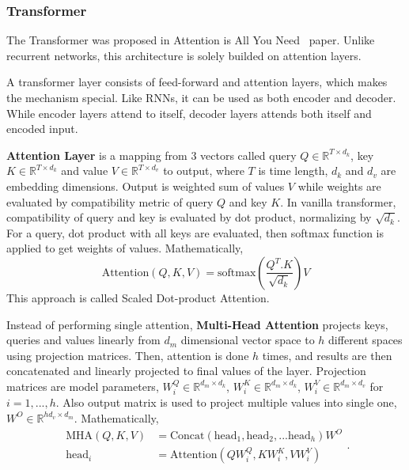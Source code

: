 \subsubsection{Transformer}

The Transformer was proposed in Attention is All You Need~ \cite{vaswani_attention_2017} paper. 
Unlike recurrent networks, this architecture is solely builded on attention layers. 

A transformer layer consists of feed-forward and attention layers, which makes the mechanism special. 
Like RNNs, it can be used as both encoder and decoder. 
While encoder layers attend to itself, decoder layers attends both itself and encoded input. 

\textbf{Attention Layer} is a mapping from 3 vectors called query $Q \in \mathbb{R}^{T \times d_k}$, key $K \in \mathbb{R}^{T \times d_k}$ and value $V \in \mathbb{R}^{T \times d_v}$ to output, 
where $T$ is time length, $d_k$ and $d_v$ are embedding dimensions. 
Output is weighted sum of values $V$ while weights are evaluated by compatibility metric of query $Q$ and key $K$. 
In vanilla transformer, compatibility of query and key is evaluated by dot product, normalizing by $\sqrt{d_k}$. 
For a query, dot product with all keys are evaluated, then softmax function is applied to get weights of values. Mathematically, 
\begin{equation}
\mathrm{Attention}(Q, K, V) = \mathrm{softmax}(\frac{Q^{T}. K}{\sqrt{d_k}}) V
\end{equation}
This approach is called Scaled Dot-product Attention. 

Instead of performing single attention, \textbf{Multi-Head Attention} projects keys, queries and values linearly from $d_m$ dimensional vector space to $h$ different spaces using projection matrices. 
Then, attention is done $h$ times, and results are then concatenated and linearly projected to final values of the layer.
Projection matrices are model parameters, $W^Q_i \in \mathbb{R}^{d_m \times d_k}$, $W^K_i \in \mathbb{R}^{d_m \times d_k}$, $W^V_i \in \mathbb{R}^{d_m \times d_v}$ for $i=1,...,h$. 
Also output matrix is used to project multiple values into single one, $W^O \in \mathbb{R}^{h d_v \times d_m}$. Mathematically, 
\begin{equation}
\begin{split}
\mathrm{MHA}(Q,K,V) &=  \text{Concat}(\mathrm{head}_1, \mathrm{head}_2, ... \mathrm{head}_h)W^O \\
\mathrm{head}_i &=  \text{Attention}(QW^Q_i,KW^K_i,VW^V_i)
\end{split}.
\end{equation}

